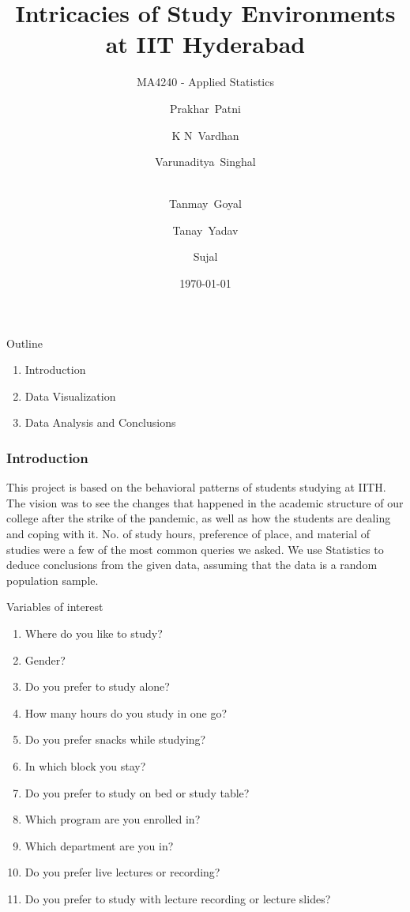 \documentclass{beamer}
\title[MA4240 - Applied Statistics]{Intricacies of Study Environments at IIT Hyderabad}
\subtitle{MA4240 - Applied Statistics}
\author[Group Project No: 3]{Prakhar~Patni \and 
  K N~Vardhan \and
  Varunaditya~Singhal \and \\
  Tanmay~Goyal \and
  Tanay~Yadav \and
  Sujal}
\date{\today}
\begin{document}
\begin{frame}
\titlepage
\end{frame}


\begin{frame}{Outline}
    \begin{enumerate}
    \item{Introduction}
    \item{Data Visualization}
    \item{Data Analysis and Conclusions}
\end{enumerate}
\end{frame}


\begin{frame}
\frametitle{Introduction}
\begin{block}{}
This project is based on the behavioral patterns of students studying at IITH. The vision was to see the changes that happened in the academic structure of our college after the strike of the pandemic, as well as how the students are dealing and coping with it. No. of study hours, preference of place, and material of studies were a few of the most common queries we asked. We use Statistics to deduce conclusions from the given data, assuming that the data is a random population sample.
\end{block}
\end{frame}

\begin{frame}
\begin{block}{Variables of interest}
\begin{enumerate}
\item Where do you like to study?
\item Gender?
\item Do you prefer to study alone?
\item How many hours do you study in one go?
\item Do you prefer snacks while studying?
\item In which block you stay?
\item Do you prefer to study on bed or study table?
\item Which program are you enrolled in?
\item Which department are you in?
\item Do you prefer live lectures or recording?
\item Do you prefer to study with lecture recording or lecture slides?
\end{enumerate}
\end{block}
\end{frame}
\end{document}
